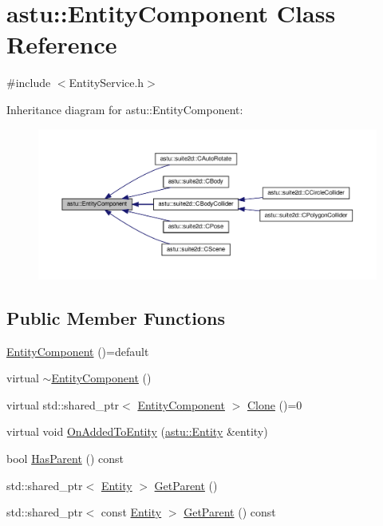\hypertarget{classastu_1_1EntityComponent}{}\section{astu\+:\+:Entity\+Component Class Reference}
\label{classastu_1_1EntityComponent}


{\ttfamily \#include $<$Entity\+Service.\+h$>$}



Inheritance diagram for astu\+:\+:Entity\+Component\+:\nopagebreak
\begin{figure}[H]
\begin{center}
\leavevmode
\includegraphics[width=350pt]{classastu_1_1EntityComponent__inherit__graph}
\end{center}
\end{figure}
\subsection*{Public Member Functions}
\begin{DoxyCompactItemize}
\item 
\hyperlink{classastu_1_1EntityComponent_a9bb95d7ddc55093fd86e04d5b6aa98ec}{Entity\+Component} ()=default
\item 
virtual \hyperlink{classastu_1_1EntityComponent_a17295f763e201247c22bc677541646e5}{$\sim$\+Entity\+Component} ()
\item 
virtual std\+::shared\+\_\+ptr$<$ \hyperlink{classastu_1_1EntityComponent}{Entity\+Component} $>$ \hyperlink{classastu_1_1EntityComponent_afeddb5a899d831255a9a4f07269f3b2d}{Clone} ()=0
\item 
virtual void \hyperlink{classastu_1_1EntityComponent_a8736f12dc9d2be7d2569408fc1040480}{On\+Added\+To\+Entity} (\hyperlink{classastu_1_1Entity}{astu\+::\+Entity} \&entity)
\item 
bool \hyperlink{classastu_1_1EntityComponent_a84f03e175444f5ca650775fb89963925}{Has\+Parent} () const
\item 
std\+::shared\+\_\+ptr$<$ \hyperlink{classastu_1_1Entity}{Entity} $>$ \hyperlink{classastu_1_1EntityComponent_ae3c2dc735241902588358b933a786603}{Get\+Parent} ()
\item 
std\+::shared\+\_\+ptr$<$ const \hyperlink{classastu_1_1Entity}{Entity} $>$ \hyperlink{classastu_1_1EntityComponent_a33a590990c23ca5bfa8d555b526d7a39}{Get\+Parent} () const
\end{DoxyCompactItemize}
